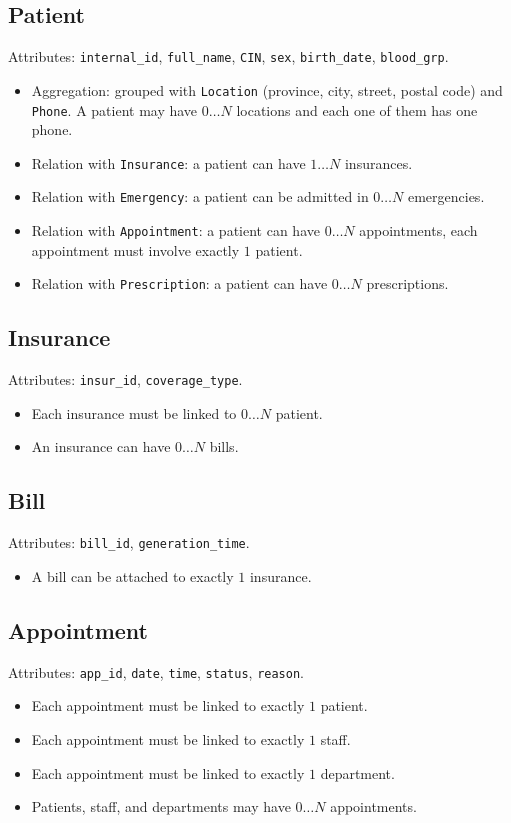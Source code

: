\documentclass[a4paper,12pt]{article}
\begin{document}
\subsection*{Patient}
Attributes: \texttt{internal\_id}, \texttt{full\_name}, \texttt{CIN}, \texttt{sex}, \texttt{birth\_date}, \texttt{blood\_grp}.  
\begin{itemize}
    \item Aggregation: grouped with \texttt{Location} (province, city, street, postal code) and \texttt{Phone}.  
    A patient may have $0\dots N$ locations and each one of them has one phone.
    \item Relation with \texttt{Insurance}: a patient can have $1\dots N$ insurances.
    \item Relation with \texttt{Emergency}: a patient can be admitted in $0\dots N$ emergencies.
    \item Relation with \texttt{Appointment}: a patient can have $0\dots N$ appointments, each appointment must involve exactly $1$ patient.
    \item Relation with \texttt{Prescription}: a patient can have $0\dots N$ prescriptions.
\end{itemize}

\subsection*{Insurance}
Attributes: \texttt{insur\_id}, \texttt{coverage\_type}.  
\begin{itemize}
    \item Each insurance must be linked to $0\dots N$ patient.
    \item An insurance can have $0\dots N$ bills.
\end{itemize}

\subsection*{Bill}
Attributes: \texttt{bill\_id}, \texttt{generation\_time}.  
\begin{itemize}
    \item A bill can be attached to exactly $1$ insurance. 
\end{itemize}

\subsection*{Appointment}
Attributes: \texttt{app\_id}, \texttt{date}, \texttt{time}, \texttt{status}, \texttt{reason}.  
\begin{itemize}
    \item Each appointment must be linked to exactly $1$ patient.
    \item Each appointment must be linked to exactly $1$ staff.
    \item Each appointment must be linked to exactly $1$ department.
    \item Patients, staff, and departments may have $0\dots N$ appointments.
\end{itemize}
\end{document}
